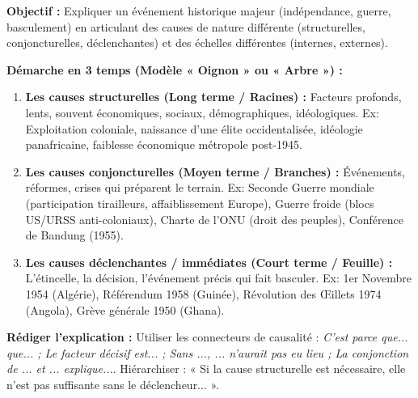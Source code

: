 \documentclass[11pt]{article}
\newcommand{\cle}[1]{{\popxbold\color{popdark}#1}}
\begin{document}
\begin{methode}
\textbf{Objectif :} Expliquer un événement historique majeur (indépendance, guerre, basculement) en articulant des causes de nature différente (structurelles, conjoncturelles, déclenchantes) et des échelles différentes (internes, externes).
\par \textbf{Démarche en 3 temps (Modèle « Oignon » ou « Arbre ») :}
\begin{enumerate}
    \item \textbf{Les causes structurelles (Long terme / Racines) :} Facteurs profonds, lents, souvent économiques, sociaux, démographiques, idéologiques. Ex: \cle{Exploitation coloniale}, \cle{naissance d'une élite occidentalisée}, \cle{idéologie panafricaine}, \cle{faiblesse économique métropole post-1945}.
    \item \textbf{Les causes conjoncturelles (Moyen terme / Branches) :} Événements, réformes, crises qui préparent le terrain. Ex: \cle{Seconde Guerre mondiale} (participation tirailleurs, affaiblissement Europe), \cle{Guerre froide} (blocs US/URSS anti-coloniaux), \cle{Charte de l'ONU} (droit des peuples), \cle{Conférence de Bandung} (1955).
    \item \textbf{Les causes déclenchantes / immédiates (Court terme / Feuille) :} L'étincelle, la décision, l'événement précis qui fait basculer. Ex: \cle{1er Novembre 1954} (Algérie), \cle{Référendum 1958} (Guinée), \cle{Révolution des Œillets 1974} (Angola), \cle{Grève générale 1950} (Ghana).
\end{enumerate}
\par \textbf{Rédiger l'explication :} Utiliser les connecteurs de causalité : \emph{C'est parce que... que... ; Le facteur décisif est... ; Sans ..., ... n'aurait pas eu lieu ; La conjonction de ... et ... explique...}. Hiérarchiser : « Si la cause structurelle est nécessaire, elle n'est pas suffisante sans le déclencheur... ».
\end{methode}
\end{document}
